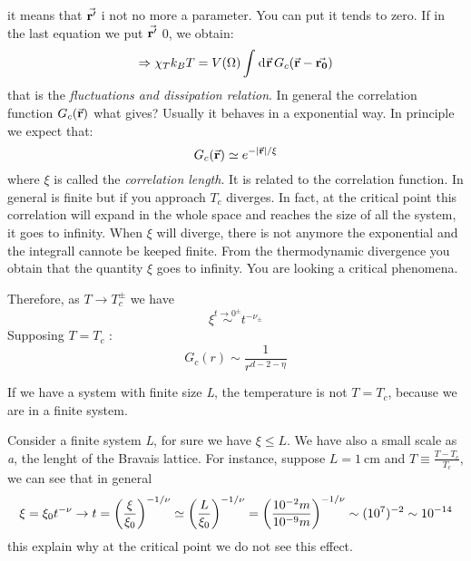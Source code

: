\documentclass[../main/main.tex]{subfiles}
\begin{document}
it means that \( \va{r'}  \) i not no more a parameter. You can put it tends to zero. If in the last equation we put \( \va{r'}  \)  0, we obtain:
\begin{equation}
  \Rightarrow   \chi _T k_B T = V (\Omega ) \int_{}^{} \dd[]{\va{r} } G_c (\va{r} -\va{r_0} )
\end{equation}
that is the \emph{fluctuations and dissipation relation}.
In general the correlation function \( G_c (\va{r} ) \) what gives? Usually it behaves in a exponential way. In principle we expect that:
\begin{equation}
  G_c (\va{r} )\simeq e^{-\abs{\va{r} }/\xi  }
\end{equation}
where \( \xi  \) is called the \emph{correlation length}. It is related to the correlation function. In general is finite but if you approach \( T_c \) diverges. In fact, at the critical point this correlation will expand in the whole space and reaches the size of all the system, it goes to infinity. When \( \xi  \) will diverge, there is not anymore the exponential and the integrall cannote be keeped finite. From the thermodynamic divergence you obtain that the quantity \( \xi  \) goes to infinity. You are looking a critical phenomena.

Therefore, as \( T \rightarrow T_c^{\pm} \) we have
\begin{equation}
  \xi \overset{t \rightarrow 0^\pm}{\sim } t^{-\nu _\pm}
\end{equation}
Supposing \( T = T_c \) :
\begin{equation}
  G_c (r) \sim \frac{1}{r^{d-2- \eta }}
\end{equation}



If we have a system with finite size \emph{L}, the temperature is not \( T=T_c \), because we are in a finite system.

Consider a finite system \emph{L}, for sure we have \( \xi \le L \).
We have also a small scale as \emph{a}, the lenght of the Bravais lattice.
For instance, suppose \( L = \SI{1}{\cm}  \) and \( T \equiv \frac{T-T_c}{T_c} \), we can see that in general
\begin{equation}
  \xi =\xi _0 t^{-\nu } \rightarrow t = \qty(\frac{\xi }{\xi_0})^{-1/\nu } \simeq \qty(\frac{L}{\xi _0})^{-1/\nu } = \qty(\frac{10^{-2} m }{10^{-9}m})^{-1/\nu } \sim (10^7)^{-2} \sim 10^{-14}
\end{equation}
this explain why at the critical point we do not see this effect.
\end{document}
